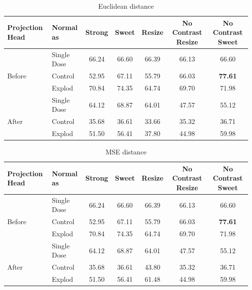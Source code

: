 \begin{table}[H]
  \centering
  \begin{tabular}{@{}llccccc@{}}
  \toprule
  Projection Head & Normal as       & Strong & Sweet & Resize & No Contrast Resize & No Contrast Sweet \\ \midrule
                  & Single Dose    & 66.24      & 66.60     & 66.39      & 66.13                  & 66.60                 \\
  Before          & Control        & 52.95      & 67.11     & 55.79      & 66.03                  & \textbf{77.61}                 \\
                  & Explod         & 70.84      & 74.35     & 64.74      & 69.70                  & 71.98                 \\ \midrule
                  & Single Dose    & 64.12      & 68.87     & 64.01      & 47.57                  & 55.12                 \\
  After           & Control        & 35.68      & 36.61     & 33.66      & 35.32                  & 36.71                 \\
                  & Explod         & 51.50      & 56.41     & 37.80      & 44.98                  & 59.98                 \\ \bottomrule
  \end{tabular}
  \caption{Euclidean distance}
  \label{tab:table_eucli}
\end{table}

\begin{table}[H]
  \centering
  \begin{tabular}{@{}llccccc@{}}
  \toprule
  Projection Head & Normal as       & Strong & Sweet & Resize & No Contrast Resize & No Contrast Sweet \\ \midrule
                  & Single Dose    & 66.24      & 66.60     & 66.39      & 66.13                  & 66.60                 \\
  Before          & Control        & 52.95      & 67.11     & 55.79      & 66.03                  & \textbf{77.61}                 \\
                  & Explod         & 70.84      & 74.35    & 64.74      & 69.70                  & 71.98                 \\ \midrule
                  & Single Dose    & 64.12      & 68.87     & 64.01      & 47.57                  & 55.12                 \\
  After           & Control        & 35.68      & 36.61     & 43.80      & 35.32                  & 36.71                 \\
                  & Explod         & 51.50      & 56.41     & 61.48      & 44.98                  & 59.98                 \\ \bottomrule
  \end{tabular}
  \caption{MSE distance}
  \label{tab:table_mse}
\end{table}

